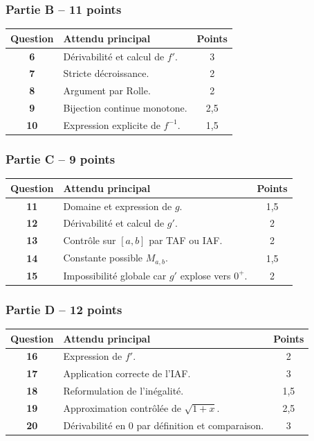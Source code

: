 \documentclass[11pt,a4paper]{article}
\begin{document}
\subsubsection*{Partie B -- 11 points}

\begin{tabularx}{\linewidth}{>{\bfseries}c X c}
\toprule
Question & Attendu principal & Points \\
\midrule
6 & Dérivabilité et calcul de \(f'\). & 3 \\
7 & Stricte décroissance. & 2 \\
8 & Argument par Rolle. & 2 \\
9 & Bijection continue monotone. & 2,5 \\
10 & Expression explicite de \(f^{-1}\). & 1,5 \\
\bottomrule
\end{tabularx}

\subsubsection*{Partie C -- 9 points}

\begin{tabularx}{\linewidth}{>{\bfseries}c X c}
\toprule
Question & Attendu principal & Points \\
\midrule
11 & Domaine et expression de \(g\). & 1,5 \\
12 & Dérivabilité et calcul de \(g'\). & 2 \\
13 & Contrôle sur \([a,b]\) par TAF ou IAF. & 2 \\
14 & Constante possible \(M_{a,b}\). & 1,5 \\
15 & Impossibilité globale car \(g'\) explose vers \(0^+\). & 2 \\
\bottomrule
\end{tabularx}

\subsubsection*{Partie D -- 12 points}

\begin{tabularx}{\linewidth}{>{\bfseries}c X c}
\toprule
Question & Attendu principal & Points \\
\midrule
16 & Expression de \(f'\). & 2 \\
17 & Application correcte de l'IAF. & 3 \\
18 & Reformulation de l'inégalité. & 1,5 \\
19 & Approximation contrôlée de \(\sqrt{1+x}\). & 2,5 \\
20 & Dérivabilité en \(0\) par définition et comparaison. & 3 \\
\bottomrule
\end{tabularx}
\end{document}
